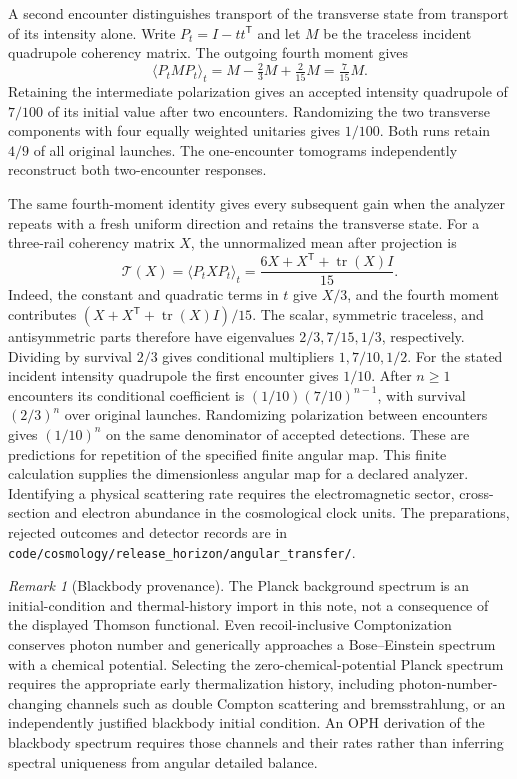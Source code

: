 \documentclass[11pt]{article}
\theoremstyle{remark}
\newtheorem{remark}[theorem]{Remark}
\begin{document}
A second encounter distinguishes transport of the transverse state from
transport of its intensity alone. Write \(P_t=I-tt^\mathsf T\) and let
\(M\) be the traceless incident quadrupole coherency matrix. The outgoing
fourth moment gives
\[
 \langle P_t M P_t\rangle_t
 =M-\tfrac{2}{3}M+\tfrac{2}{15}M=\tfrac{7}{15}M .
\]
Retaining the intermediate polarization gives an accepted intensity
quadrupole of \(7/100\) of its initial value after two encounters.
Randomizing the two transverse components with four equally weighted
unitaries gives \(1/100\). Both runs retain \(4/9\) of all original
launches. The one-encounter tomograms independently reconstruct both
two-encounter responses.

The same fourth-moment identity gives every subsequent gain when the
analyzer repeats with a fresh uniform direction and retains the transverse
state. For a three-rail coherency matrix \(X\), the unnormalized mean
after projection is
\[
 \mathcal T(X)=\langle P_t X P_t\rangle_t
 =\frac{6X+X^{\mathsf T}+\operatorname{tr}(X)I}{15}.
\]
Indeed, the constant and quadratic terms in \(t\) give \(X/3\), and
the fourth moment contributes
\((X+X^{\mathsf T}+\operatorname{tr}(X)I)/15\).
The scalar, symmetric traceless, and antisymmetric parts therefore have
eigenvalues \(2/3,7/15,1/3\), respectively. Dividing by survival
\(2/3\) gives conditional multipliers \(1,7/10,1/2\).
For the stated incident intensity quadrupole the first encounter gives
\(1/10\). After \(n\ge1\) encounters its conditional coefficient is
\((1/10)(7/10)^{n-1}\), with survival \((2/3)^n\) over original
launches. Randomizing polarization between encounters gives
\((1/10)^n\) on the same denominator of accepted detections.
These are predictions for repetition of the specified finite angular map.
This finite calculation supplies the
dimensionless angular map for a declared analyzer. Identifying a
physical scattering rate requires the electromagnetic sector,
cross-section and electron abundance in the cosmological clock units.
The preparations, rejected outcomes and detector records are in
\mbox{\nolinkurl{code/cosmology/release_horizon/angular_transfer/}}.

\begin{remark}[Blackbody provenance]
The Planck background spectrum is an initial-condition and thermal-history
import in this note, not a consequence of the displayed Thomson functional.
Even recoil-inclusive Comptonization conserves photon number and generically
approaches a Bose--Einstein spectrum with a chemical potential. Selecting
the zero-chemical-potential Planck spectrum requires the appropriate early
thermalization history, including photon-number-changing channels such as
double Compton scattering and bremsstrahlung, or an independently justified
blackbody initial condition. An OPH derivation of the blackbody spectrum
requires those channels and their rates rather than inferring
spectral uniqueness from angular detailed balance.
\end{remark}
\end{document}
